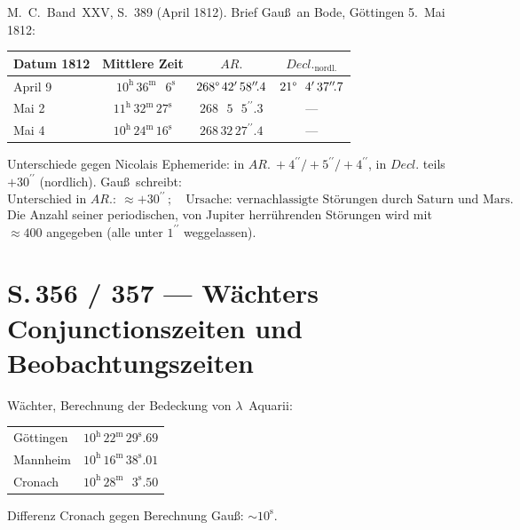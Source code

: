 \documentclass[11pt,a4paper]{article}
\newcommand{\h}{^{\mathrm{h}}}
\newcommand{\m}{^{\mathrm{m}}}
\newcommand{\s}{^{\mathrm{s}}}
\newcommand{\arcmin}{^{\prime}}
\newcommand{\arcsec}{^{\prime\prime}}
\newcommand{\arcsecdec}[1]{^{\prime\prime}\!.#1}   %
\newcommand{\sdec}[1]{^{\mathrm{s}}\!.#1}          %
\newcommand{\AR}{AR.}
\newcommand{\Decl}{Decl.}
\begin{document}
\noindent
M.~C.\ Band~XXV, S.~389 (April 1812). Brief Gau\ss\ an Bode, G\"ottingen 5.~Mai 1812:
\begin{center}
\begin{tabular}{l c c c}
\toprule
Datum 1812 & Mittlere Zeit & $\AR$ & $\Decl_{\text{nordl.}}$ \\
\midrule
April \phantom{0}9 & $\phantom{0}10\h\,36\m\ \phantom{0}6\s$  & $268\degree\,42\arcmin\,58\arcsecdec{4}$ & $21\degree\,\phantom{0}4\arcmin\,37\arcsecdec{7}$ \\
Mai \phantom{00}2  & $11\h\,32\m\,27\s$                       & $268\,\phantom{0}5\,\phantom{0}5\arcsecdec{3}$ & --- \\
Mai \phantom{00}4  & $10\h\,24\m\,16\s$                       & $268\,32\,27\arcsecdec{4}$               & --- \\
\bottomrule
\end{tabular}
\end{center}

\noindent
Unterschiede gegen Nicolais Ephemeride: in $\AR\ +4\arcsec{}/+5\arcsec{}/+4\arcsec$,
in $\Decl$ teils $+30\arcsec$ (nordlich). Gau\ss\ schreibt:
\[
\text{Unterschied in }\AR\colon\ \approx +30\arcsec\,;\quad
\text{Ursache: vernachlassigte St\"orungen durch Saturn und Mars.}
\]
Die Anzahl seiner periodischen, von Jupiter herr\"uhrenden St\"orungen wird mit
$\approx 400$ angegeben (alle unter $1\arcsec$ weggelassen).

\section*{S.\,356 / 357 --- W\"achters Conjunctionszeiten und Beobachtungszeiten}

W\"achter, Berechnung der Bedeckung von $\lambda$~Aquarii:
\begin{center}
\begin{tabular}{l l}
\toprule
G\"ottingen & $10\h\,22\m\,29\sdec{69}$\\
Mannheim    & $10\h\,16\m\,38\sdec{01}$\\
Cronach     & $10\h\,28\m\,\phantom{0}3\sdec{50}$\\
\bottomrule
\end{tabular}
\end{center}

\noindent
Differenz Cronach gegen Berechnung Gau\ss: $\sim 10\s$.
\end{document}
